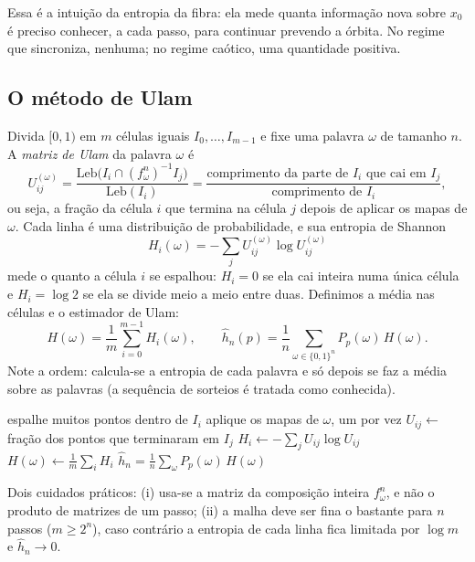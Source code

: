 Essa é a intuição da entropia da fibra: ela mede quanta informação nova sobre $x_0$ é
preciso conhecer, a cada passo, para continuar prevendo a órbita. No regime que sincroniza,
nenhuma; no regime caótico, uma quantidade positiva.

\subsection{O método de Ulam}
\label{subsec:pelikan-ulam}

Divida $[0,1)$ em $m$ células iguais $I_0,\dots,I_{m-1}$ e fixe uma palavra $\omega$ de tamanho
$n$. A \emph{matriz de Ulam} da palavra $\omega$ é
\[
  U^{(\omega)}_{ij}
  =\frac{\mathrm{Leb}\big(I_i\cap (f^n_\omega)^{-1}I_j\big)}{\mathrm{Leb}(I_i)}
  =\frac{\text{comprimento da parte de } I_i \text{ que cai em } I_j}{\text{comprimento de } I_i},
\]
ou seja, a fração da célula $i$ que termina na célula $j$ depois de aplicar os mapas de
$\omega$. Cada linha é uma distribuição de probabilidade, e sua entropia de Shannon
\[
  H_i(\omega)=-\sum_j U^{(\omega)}_{ij}\log U^{(\omega)}_{ij}
\]
mede o quanto a célula $i$ se espalhou: $H_i=0$ se ela cai inteira numa única célula e
$H_i=\log 2$ se ela se divide meio a meio entre duas. Definimos a média nas células e o
estimador de Ulam:
\[
  H(\omega)=\frac1m\sum_{i=0}^{m-1}H_i(\omega),\qquad
  \hat h_n(p)=\frac1n\sum_{\omega\in\{0,1\}^n}P_p(\omega)\,H(\omega).
\]
Note a ordem: calcula-se a entropia de cada palavra e só depois se faz a média sobre as
palavras (a sequência de sorteios é tratada como conhecida).

\begin{algorithm}[ht]
\caption{Estimador de Ulam para a entropia da fibra}
\begin{algorithmic}[1]
      \State espalhe muitos pontos dentro de $I_i$
      \State aplique os mapas de $\omega$, um por vez 
      \State $U_{ij}\gets$ fração dos pontos que terminaram em $I_j$
      \State $H_i\gets-\sum_j U_{ij}\log U_{ij}$
    \EndFor
    \State $H(\omega)\gets\frac1m\sum_i H_i$
  \EndFor
  \State \Return $\hat h_n=\frac1n\sum_\omega P_p(\omega)\,H(\omega)$
\end{algorithmic}
\end{algorithm}

Dois cuidados práticos: (i) usa-se a matriz da composição inteira $f^n_\omega$, e não o produto
de matrizes de um passo; (ii) a malha deve ser fina o bastante para $n$ passos ($m\ge 2^n$),
caso contrário a entropia de cada linha fica limitada por $\log m$ e $\hat h_n\to0$.

